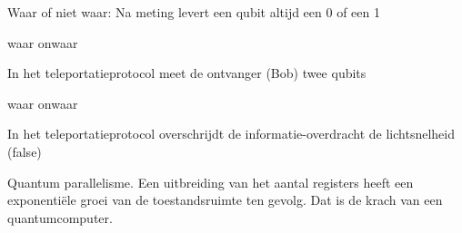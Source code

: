 \documentclass[a4paper, addpoints, 12pt
    , answers    %
    ]{exam}
\begin{document}
\begin{questions}
\question [1]
Waar of niet waar: Na meting levert een qubit altijd een 0 of een 1
\begin{oneparchoices}
\correctchoice waar
\choice onwaar
\end{oneparchoices}


\question[1]
In het teleportatieprotocol meet de ontvanger (Bob) twee qubits
\begin{oneparchoices}
\choice waar
\correctchoice onwaar
\end{oneparchoices}

In het teleportatieprotocol overschrijdt de  informatie-overdracht de lichtsnelheid (false)

\question[1]
Quantum parallelisme. Een uitbreiding van het aantal registers heeft een exponenti\"ele groei van de toestandsruimte ten gevolg. Dat is de krach van een quantumcomputer.
\end{questions}
\end{document}
